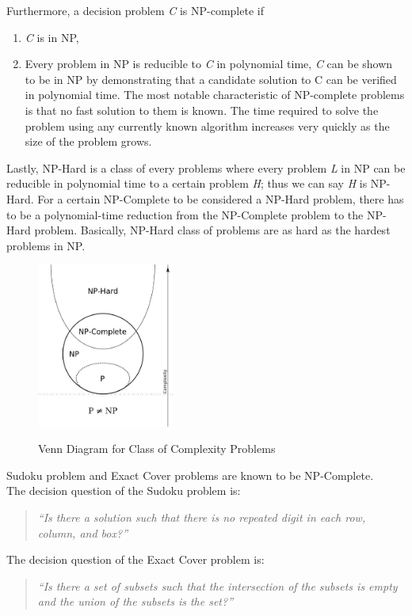 \documentclass[a4paper,oneside,11pt]{report}
\begin{document}
Furthermore, a decision problem \emph{C} is NP-complete if
\begin{enumerate}
\item \emph{C} is in NP,
\item Every problem in NP is reducible to \emph{C} in polynomial time, \emph{C} can be shown to be in NP by demonstrating that a candidate solution to C can be verified in polynomial time. The most notable characteristic of NP-complete problems is that no fast solution to them is known. The time required to solve the problem using any currently known algorithm increases very quickly as the size of the problem grows.
\end{enumerate}
Lastly, NP-Hard is a class of every problems where every problem \emph{L} in NP can be reducible in polynomial time to a certain problem \emph{H}; thus we can say \emph{H} is NP-Hard. For a certain NP-Complete to be considered a NP-Hard problem, there has to be a polynomial-time reduction from the NP-Complete problem to the NP-Hard problem. Basically, NP-Hard class of problems are as hard as the hardest problems in NP.\\
\begin{figure}[h]
  \centering
  {\includegraphics[width=0.4\textwidth]{venndiagram.jpg}\label{fig:venndiagram}}
  \caption{Venn Diagram for Class of Complexity Problems}
\end{figure}
\newpage
Sudoku problem and Exact Cover problems are known to be NP-Complete.\\

The decision question of the Sudoku problem is:
\begin{quote}
\textit{``Is there a solution such that there is no repeated digit in each row, column, and box?''}
\end{quote}

The decision question of the Exact Cover problem is:
\begin{quote}
\textit{``Is there a set of subsets such that the intersection of the subsets is empty and the union of the subsets is the set?''}
\end{quote}
\end{document}
